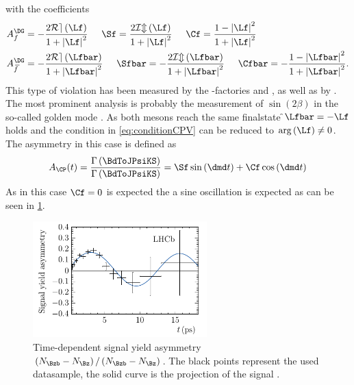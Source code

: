 with the \CP coefficients
\begin{align}
A_f^{\DG}&=-\frac{2\mathcal{Re}\left(\Lf\right)}{1+\left|\Lf\right|^2}\hspace{0.5cm}
\Sf=\frac{2\mathcal{Im}\left(\Lf\right)}{1+\left|\Lf\right|^2}\hspace{0.5cm}
\Cf=\frac{1-\left|\Lf\right|^2}{1+\left|\Lf\right|^2}\\
A_{\kern 1.5pt\overline{\kern -1.5pt f\kern 1.5pt}}^{\DG}&=-\frac{2\mathcal{Re}\left(\Lfbar\right)}{1+\left|\Lfbar\right|^2}\hspace{0.5cm}
\Sfbar=-\frac{2\mathcal{Im}\left(\Lfbar\right)}{1+\left|\Lfbar\right|^2}\hspace{0.5cm}
\Cfbar=-\frac{1-\left|\Lfbar\right|^2}{1+\left|\Lfbar\right|^2}.
\end{align}
This type of \CP violation has been measured by the \B-factories \belle and \babar, as well as by \lhcb.
The most prominent analysis is probably the measurement of $\sin\left(2\beta\right)$ in the so-called golden mode \BdToJPsiKS \cite{Aaij:2015vza}.
As both \Bz mesons reach the same finalstate \f $\Lfbar=-\Lf$ holds and the condition in \cref{eq:conditionCPV} can be reduced to $\arg\left(\Lf\right)\neq0$.
The \CP asymmetry in this case is defined as
\begin{equation}
A_{\CP}(t)=\frac{\Gamma\left(\BdToJPsiKS\right)}{\Gamma\left(\BdToJPsiKS\right)}=\Sf\sin\left(\dmd t\right)+\Cf\cos\left(\dmd t\right)
\end{equation}
As in this case $\Cf=0$ is expected the a sine oscillation is expected as can be seen in \cref{fig:sin2beta}.
\begin{figure}[tbp]
	\centering
	\includegraphics[width=0.6\textwidth]{03CPV/figs/InterferenceCPV.pdf}
	\caption{Time-dependent signal yield asymmetry $\left(N_{\Bzb}-N_{\Bz}\right)/\left(N_{\Bzb}-N_{\Bz}\right)$. The black points represent the used datasample, the solid curve is the projection of the signal \PDF.}
	\label{fig:sin2beta}
\end{figure}

